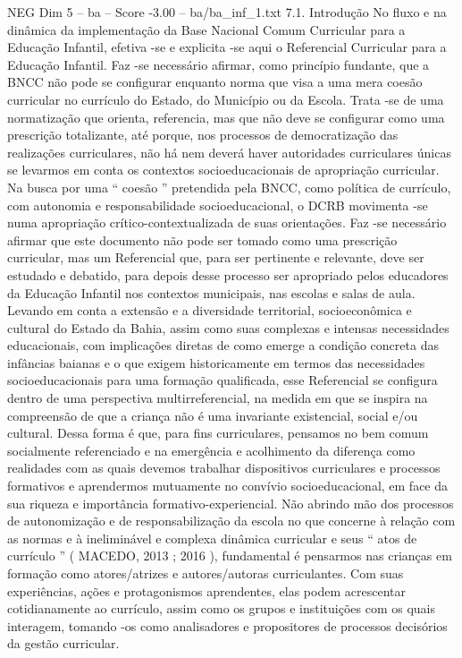 \begin{textsample}{NEG Dim 5 – ba – Score -3.00 – ba/ba\_inf\_1.txt}  \label{ex:f5_neg_008}
7.1.
Introdução No fluxo e na dinâmica da implementação da Base Nacional Comum Curricular para a Educação Infantil, efetiva -se e explicita -se aqui o Referencial Curricular para a Educação Infantil.
Faz -se necessário afirmar, como princípio fundante, que a BNCC não pode se configurar enquanto norma que visa a uma mera coesão curricular no currículo do Estado, do Município ou da Escola.
Trata -se de uma normatização que orienta, referencia, mas que não deve se configurar como uma prescrição totalizante, até porque, nos processos de democratização das realizações curriculares, não há nem deverá haver autoridades curriculares únicas se levarmos em conta os contextos socioeducacionais de apropriação curricular.
Na busca por uma “ coesão ” pretendida pela BNCC, como política de currículo, com autonomia e responsabilidade socioeducacional, o DCRB movimenta -se numa apropriação crítico-contextualizada de suas orientações.
Faz -se necessário afirmar que este documento não pode ser tomado como uma prescrição curricular, mas um Referencial que, para ser pertinente e relevante, deve ser estudado e debatido, para depois desse processo ser apropriado pelos educadores da Educação Infantil nos contextos municipais, nas escolas e salas de aula.
Levando em conta a extensão e a diversidade territorial, socioeconômica e cultural do Estado da Bahia, assim como suas complexas e intensas necessidades educacionais, com implicações diretas de como emerge a condição concreta das infâncias baianas e o que exigem historicamente em termos das necessidades socioeducacionais para uma formação qualificada, esse Referencial se configura dentro de uma perspectiva multirreferencial, na medida em que se inspira na compreensão de que a criança não é uma invariante existencial, social e/ou cultural.
Dessa forma é que, para fins curriculares, pensamos no bem comum socialmente referenciado e na emergência e acolhimento da diferença como realidades com as quais devemos trabalhar dispositivos curriculares e processos formativos e aprendermos mutuamente no convívio socioeducacional, em face da sua riqueza e importância formativo-experiencial.
Não abrindo mão dos processos de autonomização e de responsabilização da escola no que concerne à relação com as normas e à ineliminável e complexa dinâmica curricular e seus “ atos de currículo ” ( MACEDO, 2013 ; 2016 ), fundamental é pensarmos nas crianças em formação como atores/atrizes e autores/autoras curriculantes.
Com suas experiências, ações e protagonismos aprendentes, elas podem acrescentar cotidianamente ao currículo, assim como os grupos e instituições com os quais interagem, tomando -os como analisadores e propositores de processos decisórios da gestão curricular.

\end{textsample}
